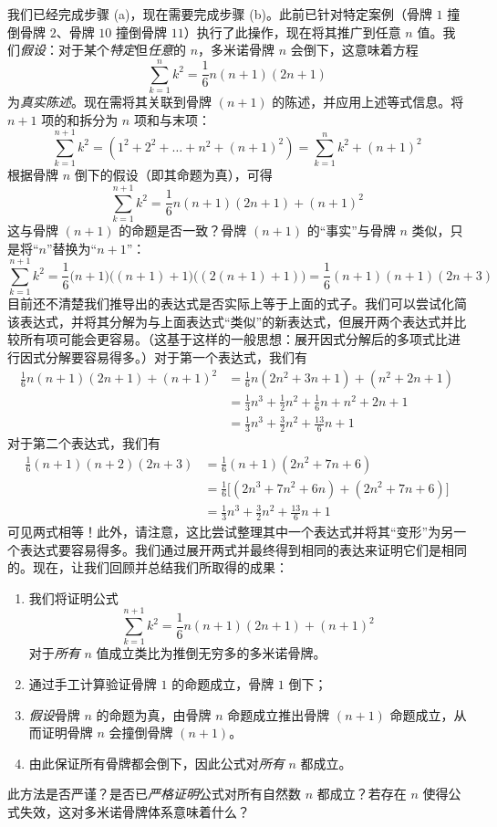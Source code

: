 我们已经完成步骤 (a)，现在需要完成步骤 (b)。此前已针对特定案例（骨牌 $1$ 撞倒骨牌 $2$、骨牌 $10$ 撞倒骨牌 $11$）执行了此操作，现在将其推广到任意 $n$ 值。我们\emph{假设}：对于某个\emph{特定}但\emph{任意}的 $n$，多米诺骨牌 $n$ 会倒下，这意味着方程
\[\sum_{k=1}^{n}k^2=\frac{1}{6}n(n+1)(2n+1)\]
为\emph{真实陈述}。现在需将其关联到骨牌 $(n+1)$ 的陈述，并应用上述等式信息。将 $n+1$ 项的和拆分为 $n$ 项和与末项：
\[\sum_{k=1}^{n+1}k^2 = (1^2+2^2+\dots+n^2+(n+1)^2)=\sum_{k=1}^{n}k^2+(n+1)^2\]
根据骨牌 $n$ 倒下的假设（即其命题为真），可得
\[\sum_{k=1}^{n+1}k^2 = \frac{1}{6}n(n+1)(2n+1)+(n+1)^2\]
这与骨牌 $(n+1)$ 的命题是否一致？骨牌 $(n+1)$ 的``事实''与骨牌 $n$ 类似，只是将``$n$''替换为``$n + 1$''：
\[\sum_{k=1}^{n+1}k^2 = \frac{1}{6}\big(n+1\big)\big((n+1)+1\big)\big((2(n+1)+1)\big)=\frac{1}{6}(n+1)(n+1)(2n+3)\]
目前还不清楚我们推导出的表达式是否实际上等于上面的式子。我们可以尝试化简该表达式，并将其分解为与上面表达式``类似''的新表达式，但展开两个表达式并比较所有项可能会更容易。（这基于这样的一般思想：展开因式分解后的多项式比进行因式分解要容易得多。）对于第一个表达式，我们有
\begin{align*}
    \frac{1}{6}n(n + 1)(2n + 1) + (n + 1)^2 &=\frac{1}{6}n(2n^2 + 3n + 1) + (n^2 + 2n + 1)\\
    &= \frac{1}{3}n^3 + \frac{1}{2}n^2 + \frac{1}{6}n + n^2 + 2n + 1 \\
    &= \frac{1}{3}n^3 + \frac{3}{2}n^2 + \frac{13}{6}n + 1
\end{align*}
对于第二个表达式，我们有
\begin{align*}
    \frac{1}{6}(n+1)(n + 2)(2n + 3) &=\frac{1}{6}(n+1)(2n^2 + 7n+6)\\
    &= \frac{1}{6}\big[(2n^3 + 7n^2 + 6n) + (2n^2 + 7n + 6)\big] \\
    &= \frac{1}{3}n^3 + \frac{3}{2}n^2 + \frac{13}{6}n + 1
\end{align*}
可见两式相等！此外，请注意，这比尝试整理其中一个表达式并将其``变形''为另一个表达式要容易得多。我们通过展开两式并最终得到相同的表达来证明它们是相同的。现在，让我们回顾并总结我们所取得的成果：
\begin{enumerate}
    \item 我们将证明公式
    \[\sum_{k=1}^{n+1}k^2 = \frac{1}{6}n(n+1)(2n+1)+(n+1)^2\]
    对于\emph{所有} $n$ 值成立类比为推倒无穷多的多米诺骨牌。
    \item 通过手工计算验证骨牌 $1$ 的命题成立，骨牌 $1$ 倒下；
    \item \emph{假设}骨牌 $n$ 的命题为真，由骨牌 $n$ 命题成立推出骨牌 $(n+1)$ 命题成立，从而证明骨牌 $n$ 会撞倒骨牌 $(n+1)$。
    \item 由此保证所有骨牌都会倒下，因此公式对\emph{所有} $n$ 都成立。
\end{enumerate}
此方法是否严谨？是否已\emph{严格证明}公式对所有自然数 $n$ 都成立？若存在 $n$ 使得公式失效，这对多米诺骨牌体系意味着什么？

